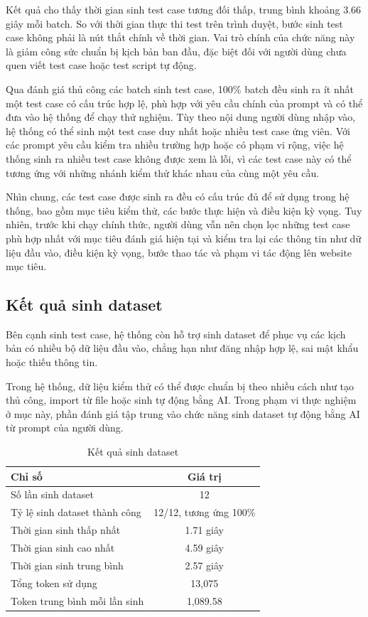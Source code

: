 Kết quả cho thấy thời gian sinh test case tương đối thấp, trung bình khoảng 3.66 giây mỗi batch. So với thời gian thực thi test trên trình duyệt, bước sinh test case không phải là nút thắt chính về thời gian. Vai trò chính của chức năng này là giảm công sức chuẩn bị kịch bản ban đầu, đặc biệt đối với người dùng chưa quen viết test case hoặc test script tự động.

Qua đánh giá thủ công các batch sinh test case, 100\% batch đều sinh ra ít nhất một test case có cấu trúc hợp lệ, phù hợp với yêu cầu chính của prompt và có thể đưa vào hệ thống để chạy thử nghiệm. Tùy theo nội dung người dùng nhập vào, hệ thống có thể sinh một test case duy nhất hoặc nhiều test case ứng viên. Với các prompt yêu cầu kiểm tra nhiều trường hợp hoặc có phạm vi rộng, việc hệ thống sinh ra nhiều test case không được xem là lỗi, vì các test case này có thể tương ứng với những nhánh kiểm thử khác nhau của cùng một yêu cầu.

Nhìn chung, các test case được sinh ra đều có cấu trúc đủ để sử dụng trong hệ thống, bao gồm mục tiêu kiểm thử, các bước thực hiện và điều kiện kỳ vọng. Tuy nhiên, trước khi chạy chính thức, người dùng vẫn nên chọn lọc những test case phù hợp nhất với mục tiêu đánh giá hiện tại và kiểm tra lại các thông tin như dữ liệu đầu vào, điều kiện kỳ vọng, bước thao tác và phạm vi tác động lên website mục tiêu.

\subsection{Kết quả sinh dataset}

Bên cạnh sinh test case, hệ thống còn hỗ trợ sinh dataset để phục vụ các kịch bản có nhiều bộ dữ liệu đầu vào, chẳng hạn như đăng nhập hợp lệ, sai mật khẩu hoặc thiếu thông tin.

Trong hệ thống, dữ liệu kiểm thử có thể được chuẩn bị theo nhiều cách như tạo thủ công, import từ file hoặc sinh tự động bằng AI. Trong phạm vi thực nghiệm ở mục này, phần đánh giá tập trung vào chức năng sinh dataset tự động bằng AI từ prompt của người dùng.

\begin{table}[H]
\centering
\caption{Kết quả sinh dataset}
\label{tab:chapter6_dataset_generation_result}
\renewcommand{\arraystretch}{1.2}
\begin{tabular}{|p{8.5cm}|c|}
\hline
\textbf{Chỉ số} & \textbf{Giá trị} \\
\hline
Số lần sinh dataset & 12 \\
\hline
Tỷ lệ sinh dataset thành công & 12/12, tương ứng 100\% \\
\hline
Thời gian sinh thấp nhất & 1.71 giây \\
\hline
Thời gian sinh cao nhất & 4.59 giây \\
\hline
Thời gian sinh trung bình & 2.57 giây \\
\hline
Tổng token sử dụng & 13,075 \\
\hline
Token trung bình mỗi lần sinh & 1,089.58 \\
\hline
\end{tabular}
\end{table}

